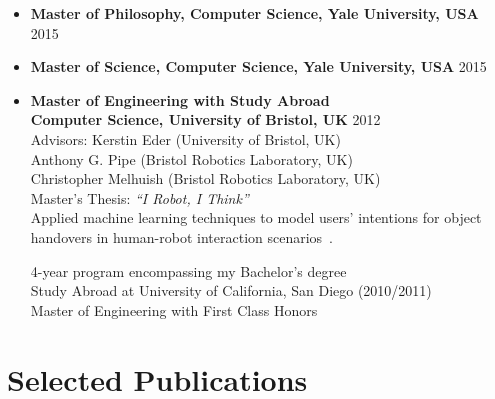 \documentclass[10pt,letterpaper]{article}
\newcommand{\thing}[2]{{#1} \hfill {#2}}
\begin{document}
\begin{itemize}
\item \thing{\bf Master of Philosophy, Computer Science, Yale University, USA}{2015}
\item \thing{\bf Master of Science, Computer Science, Yale University, USA}{2015}
\item \thing{\bf Master of Engineering with Study Abroad\\Computer Science, University of Bristol, UK}{2012}\\
	Advisors: Kerstin Eder (University of Bristol, UK)\\
	\hphantom{Advisors:} Anthony G. Pipe (Bristol Robotics Laboratory, UK)\\
	\hphantom{Advisors:} Christopher Melhuish (Bristol Robotics Laboratory, UK)\\
	Master's Thesis: {\it ``I Robot, I Think''}\\
	Applied machine learning techniques to model users' intentions for object handovers in human-robot interaction scenarios~\cite{grigore2013joint}.

	4-year program encompassing my Bachelor's degree\\
	Study Abroad at University of California, San Diego (2010/2011)\\
	Master of Engineering with First Class Honors


\end{itemize}

\vspace{-1.1em}
\section{Selected Publications}
\vspace{-0.5em}
\nocite{*} %
\setlength{\biblabelsep}{0.5em} %
\printbibliography[heading=none,keyword=publication]

\vspace{-1.2em}
\end{document}
